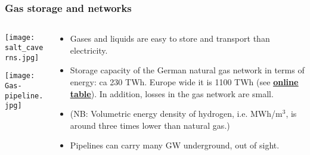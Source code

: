 \documentclass[10pt,aspectratio=169,dvipsnames]{beamer}
\let\olditem\item
\renewcommand{\item}{%
\olditem\vspace{5pt}}
\begin{document}
\begin{frame}
  \frametitle{Gas storage and networks}

  \begin{columns}[T]
    \begin{column}{5cm}
      \texttt{[image: salt\_caverns.jpg]}

      \vspace{.4cm}

      \texttt{[image: Gas-pipeline.jpg]}
    \end{column}

    \begin{column}{7cm}
            \begin{itemize}
      \item  Gases and liquids are easy to \alert{store} and \alert{transport} than electricity.
        \item Storage capacity of the German natural gas network in terms of energy: ca 230 TWh. Europe wide it is 1100 TWh (see \href{https://agsi.gie.eu/}{\bf\color{blue}\underline{online table}}). In addition, losses in the gas network are small.
\item   (NB: Volumetric energy density of hydrogen, i.e. MWh/m$^3$, is around three times lower than natural gas.)
\item      Pipelines can carry many GW underground, out of sight.
            \end{itemize}
    \end{column}

\end{columns}

\end{frame}
\end{document}
